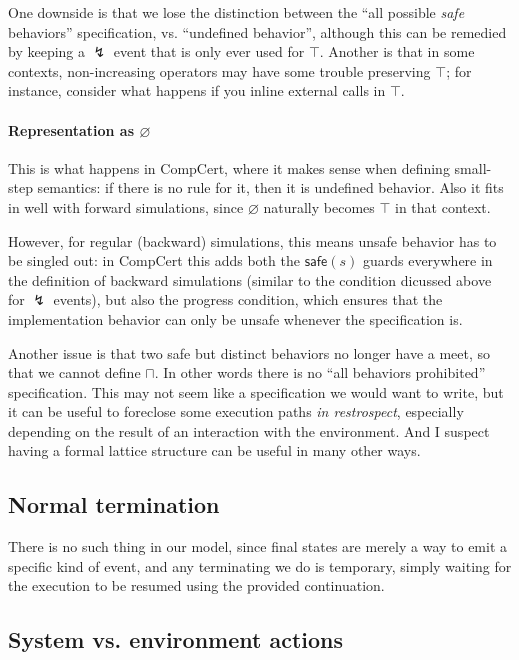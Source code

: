 \documentclass[11pt]{article}
\begin{document}
One downside is that we lose the distinction between
the ``all possible \emph{safe} behaviors'' specification,
vs. ``undefined behavior'',
although this can be remedied by keeping a $\lightning$ event
that is only ever used for $\top$.
Another is that in some contexts,
non-increasing operators 
may have some trouble preserving $\top$;
for instance, consider what happens if you
inline external calls in $\top$.

\paragraph{Representation as $\varnothing$}

This is what happens in CompCert,
where it makes sense when defining small-step semantics:
if there is no rule for it,
then it is undefined behavior.
Also it fits in well with forward simulations,
since $\varnothing$ naturally becomes $\top$ in that context.

However, for regular (backward) simulations,
this means unsafe behavior has to be singled out:
in CompCert this adds both the $\mathsf{safe}(s)$
guards everywhere in the definition of backward simulations
(similar to the condition dicussed above for $\lightning$ events),
but also the progress condition,
which ensures that the implementation behavior
can only be unsafe whenever the specification is.

Another issue is that
two safe but distinct behaviors no longer have a meet,
so that we cannot define $\sqcap$.
In other words there is no ``all behaviors prohibited'' specification.
This may not seem like a specification we would want to write,
but it can be useful to foreclose some execution paths \emph{in restrospect},
especially depending on the result of an interaction with the environment.
And I suspect having a formal lattice structure
can be useful in many other ways.


\subsection{Normal termination} %

There is no such thing in our model,
since final states are merely a way to emit
a specific kind of event,
and any terminating we do is temporary,
simply waiting for the execution to be resumed
using the provided continuation.


\subsection{System vs. environment actions} %
\end{document}
